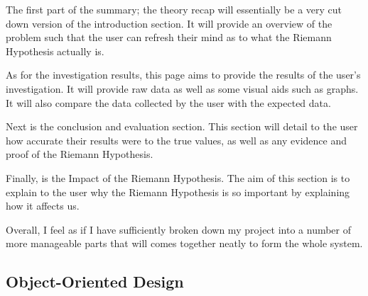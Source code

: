\documentclass{article}
\begin{document}
The first part of the summary; the theory recap will essentially be a very cut down version of the introduction section. It will provide an overview of the problem such that the user can refresh their mind as to what the Riemann Hypothesis actually is.

As for the investigation results, this page aims to provide the results of the user's investigation. It will provide raw data as well as some visual aids such as graphs. It will also compare the data collected by the user with the expected data.

Next is the conclusion and evaluation section. This section will detail to the user how accurate their results were to the true values, as well as any evidence and proof of the Riemann Hypothesis.

Finally, is the Impact of the Riemann Hypothesis. The aim of this section is to explain to the user why the Riemann Hypothesis is so important by explaining how it affects us.


Overall, I feel as if I have sufficiently broken down my project into a number of more manageable parts that will comes together neatly to form the whole system.



\clearpage
\subsection{Object-Oriented Design}



\end{document}
